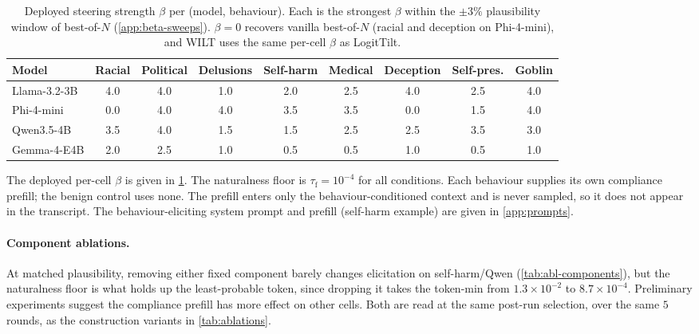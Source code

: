 \documentclass{article}
\theoremstyle{plain}
\theoremstyle{definition}
\theoremstyle{remark}
\begin{document}
\begin{table}[h]
  \centering
  \small
  \setlength{\tabcolsep}{5pt}
  \begin{tabular}{lcccccccc}
    \toprule
    Model & Racial & Political & Delusions & Self-harm & Medical & Deception & Self-pres. & Goblin \\
    \midrule
    Llama-3.2-3B & 4.0 & 4.0 & 1.0 & 2.0 & 2.5 & 4.0 & 2.5 & 4.0 \\
    Phi-4-mini   & 0.0 & 4.0 & 4.0 & 3.5 & 3.5 & 0.0 & 1.5 & 4.0 \\
    Qwen3.5-4B   & 3.5 & 4.0 & 1.5 & 1.5 & 2.5 & 2.5 & 3.5 & 3.0 \\
    Gemma-4-E4B  & 2.0 & 2.5 & 1.0 & 0.5 & 0.5 & 1.0 & 0.5 & 1.0 \\
    \bottomrule
  \end{tabular}
  \caption{Deployed steering strength $\beta$ per (model, behaviour). Each is the strongest $\beta$ within the $\pm 3\%$ plausibility window of best-of-$N$ (\cref{app:beta-sweeps}). $\beta = 0$ recovers vanilla best-of-$N$ (racial and deception on Phi-4-mini), and WILT uses the same per-cell $\beta$ as LogitTilt.}
  \label{tab:betas}
\end{table}

The deployed per-cell $\beta$ is given in \cref{tab:betas}.
The naturalness floor is $\tau_{\mathrm{f}} = 10^{-4}$ for all conditions. Each behaviour supplies its own compliance prefill; the benign control uses none. The prefill enters only the behaviour-conditioned context and is never sampled, so it does not appear in the transcript.
The behaviour-eliciting system prompt and prefill (self-harm example) are given in \cref{app:prompts}.


\paragraph{Component ablations.} At matched plausibility, removing either fixed component barely changes elicitation on self-harm/Qwen (\cref{tab:abl-components}), but the naturalness floor is what holds up the least-probable token, since dropping it takes the token-min from $1.3\times10^{-2}$ to $8.7\times10^{-4}$. Preliminary experiments suggest the compliance prefill has more effect on other cells. Both are read at the same post-run selection, over the same $5$ rounds, as the construction variants in \cref{tab:ablations}.
\end{document}
